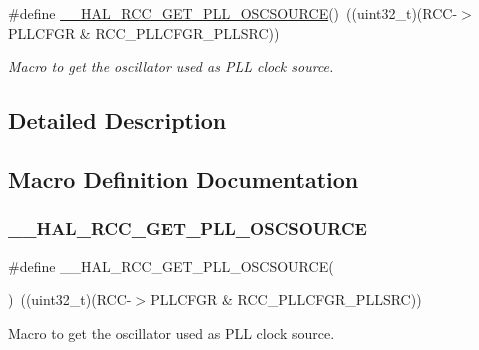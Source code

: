 \begin{DoxyCompactItemize}
\#define \mbox{\hyperlink{group___r_c_c___get___clock__source_ga3ea1390f8124e2b3b8d53e95541d6e53}{\+\_\+\+\_\+\+H\+A\+L\+\_\+\+R\+C\+C\+\_\+\+G\+E\+T\+\_\+\+P\+L\+L\+\_\+\+O\+S\+C\+S\+O\+U\+R\+CE}}()~((uint32\+\_\+t)(R\+CC-\/$>$P\+L\+L\+C\+F\+GR \& R\+C\+C\+\_\+\+P\+L\+L\+C\+F\+G\+R\+\_\+\+P\+L\+L\+S\+RC))
\begin{DoxyCompactList}\small\item\em Macro to get the oscillator used as P\+LL clock source. \end{DoxyCompactList}\end{DoxyCompactItemize}


\subsection{Detailed Description}


\subsection{Macro Definition Documentation}
\mbox{\label{group___r_c_c___get___clock__source_ga3ea1390f8124e2b3b8d53e95541d6e53}} 
\subsubsection{\texorpdfstring{\_\_HAL\_RCC\_GET\_PLL\_OSCSOURCE}{\_\_HAL\_RCC\_GET\_PLL\_OSCSOURCE}}
{\footnotesize\ttfamily \#define \+\_\+\+\_\+\+H\+A\+L\+\_\+\+R\+C\+C\+\_\+\+G\+E\+T\+\_\+\+P\+L\+L\+\_\+\+O\+S\+C\+S\+O\+U\+R\+CE(\begin{DoxyParamCaption}{ }\end{DoxyParamCaption})~((uint32\+\_\+t)(R\+CC-\/$>$P\+L\+L\+C\+F\+GR \& R\+C\+C\+\_\+\+P\+L\+L\+C\+F\+G\+R\+\_\+\+P\+L\+L\+S\+RC))}



Macro to get the oscillator used as P\+LL clock source. 


